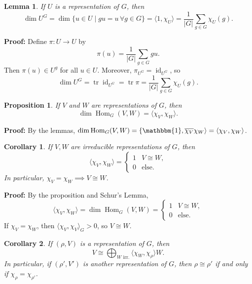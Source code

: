 \documentclass[12pt]{article}
\DeclareMathOperator{\tr}{tr}
\DeclareMathOperator{\id}{id}
\DeclareMathOperator{\Hom}{Hom}
\newtheorem{corollary}{Corollary}[section]
\newtheorem{lemma}{Lemma}[section]
\newtheorem{proposition}{Proposition}[section]
\theoremstyle{definition}
\theoremstyle{remark}
\begin{document}
\begin{lemma}
	If $U$ is a representation of $G$, then
	\[
		\dim U^{G} = \dim \{ u \in U \mid gu=u\, \forall g \in G\} = \langle 1, \chi_U\rangle = \frac{1}{|G|} \sum_{g \in G}\chi_U(g)
	.\]
\end{lemma}

\begin{adjustbox}{minipage = \columnwidth - 25.5pt, margin=1em, frame=1pt, margin=0em}
\textbf{Proof:} Define $\pi : U \to U$ by
\[
	\pi(u) = \frac{1}{|G|} \sum_{g \in G}gu
.\]
Then $\pi(u) \in U^{g}$ for all $u \in U$. Moreover, $\pi_{U^{G}} = \id_{U^{G}}$, so
\[
	\dim U^{G} = \tr \id_{U^{G}} = \tr \pi = \frac{1}{|G|} \sum_{g \in G}\chi_U(g)
.\]
\end{adjustbox}

\begin{proposition}
	If $V$ and $W$ are representations of $G$, then
	\[
		\dim \Hom_G(V, W) = \langle \chi_V, \chi_W \rangle
	.\]
\end{proposition}

\begin{adjustbox}{minipage = \columnwidth - 25.5pt, margin=1em, frame=1pt, margin=0em}
	\textbf{Proof:} By the lemmas, $\dim \Hom_G(V, W) = \{\mathbbm{1}, \overline{\chi_V}\chi_W \rangle = \langle \chi_V, \chi_W \rangle$.
\end{adjustbox}

\begin{corollary}
	If $V, W$ are irreducible representations of $G$, then
	\[
		\langle \chi_V, \chi_W \rangle =
		\begin{cases}
			1 & V \cong W, \\
			0 & \text{else}.
		\end{cases}
	\]
	In particular, $\chi_V = \chi_W \implies V \cong W$.
\end{corollary}

\begin{adjustbox}{minipage = \columnwidth - 25.5pt, margin=1em, frame=1pt, margin=0em}
\textbf{Proof:} By the proposition and Schur's Lemma,
\[
	\langle \chi_V, \chi_W \rangle = \dim \Hom_G(V, W) =
	\begin{cases}
		1 & V \cong W, \\
		0 & \text{else}.
	\end{cases}
\]
If $\chi_V= \chi_W$, then $\langle \chi_V, \chi_V \rangle_{G} > 0$, so $V \cong W$.
\end{adjustbox}

\begin{corollary}
	If $(\rho, V)$ is a representation of $G$, then
	\[
		V \cong \bigoplus_{W \text{ irr.}} \langle \chi_W, \chi_{\rho} \rangle W
	.\]
	In particular, if $(\rho', V')$ is another representation of $G$, then $\rho \cong \rho'$ if and only if $\chi_\rho = \chi_{\rho'}$.
\end{corollary}
\end{document}

